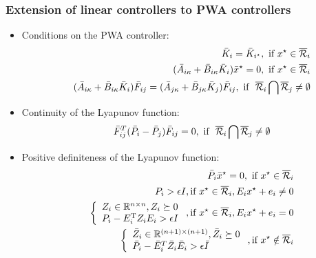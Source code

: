 \documentclass{beamer}
\newcommand{\TR}{\text{T}}
\newcommand{\RR}{{\cal R}}
\newcommand{\RE}{{\mathbb R}}
\begin{document}
  \frame
  {
    \frametitle{Extension of linear controllers to PWA controllers}
\begin{itemize}
\item<1-> Conditions on the PWA controller:
\begin{eqnarray*}
&&\bar K_{i}=\bar K_{i^\star},\text{ if }x^\star\in\overline\RR_i\\
&&(\bar A_{i\kappa}+\bar B_{i\kappa}\bar K_i)\bar x^\star = 0,\text{ if }x^\star\in\overline\RR_i\\
&&(\bar A_{i\kappa}+\bar B_{i\kappa}\bar K_i)\bar F_{ij}=(\bar A_{j\kappa}+\bar B_{j\kappa}\bar K_j)\bar F_{ij},\text{ if }\ \overline\RR_i\bigcap\overline\RR_j\neq\emptyset
\end{eqnarray*}
\item<2-> Continuity of the Lyapunov function:
\begin{eqnarray*}
&& \bar F_{ij}^T(\bar P_i-\bar P_j)\bar F_{ij}=0,\text{ if }\ \overline\RR_i\bigcap\overline\RR_j\neq\emptyset
\end{eqnarray*}
\item<3-> Positive definiteness of the Lyapunov function:
\begin{eqnarray*}
&& \bar P_i\bar x^\star=0,\text{ if }x^\star\in\overline\RR_i\\
&& P_i>\epsilon I,\text{if }x^\star\in\overline\RR_i, E_ix^\star+e_i\neq 0\\
&& \left\{\begin{array}{l}Z_i\in\RE^{n\times n}, Z_i\succeq 0 \\
 P_i-E_i^\TR Z_i E_i > \epsilon I\end{array}\right.,\text{if }x^\star\in\overline\RR_i, E_ix^\star+e_i=0\\
&& \left\{\begin{array}{l}\bar Z_i\in\RE^{(n+1)\times (n+1)}, \bar Z_i\succeq 0\\
\bar P_i-\bar{E}_i^T \bar Z_i\bar{E}_i > \epsilon\bar I\end{array}\right.,\text{if }x^\star\notin\overline\RR_i
\end{eqnarray*}
\end{itemize}
}
\end{document}
